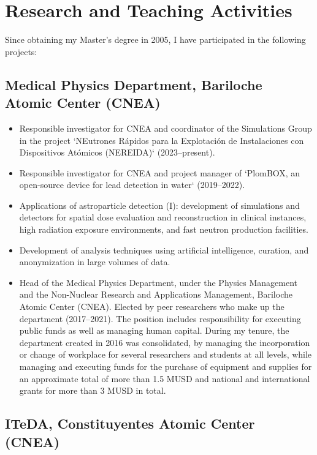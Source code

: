 \ifeng
\section*{Research and Teaching Activities}

Since obtaining my Master's degree in 2005, I have participated in the following projects:

\subsection*{Medical Physics Department, Bariloche Atomic Center (CNEA)}
\begin{itemize}
\item Responsible investigator for CNEA and coordinator of the Simulations Group in the project `NEutrones Rápidos para la Explotación de Instalaciones con Dispositivos Atómicos (NEREIDA)` (2023--present).
\item Responsible investigator for CNEA and project manager of `PlomBOX, an open-source device for lead detection in water` (2019--2022).
\item Applications of astroparticle detection (I): development of simulations and detectors for spatial dose evaluation and reconstruction in clinical instances, high radiation exposure environments, and fast neutron production facilities.
\item Development of analysis techniques using artificial intelligence, curation, and anonymization in large volumes of data.
\item Head of the Medical Physics Department, under the Physics Management and the Non-Nuclear Research and Applications Management, Bariloche Atomic Center (CNEA).
Elected by peer researchers who make up the department (2017--2021).
The position includes responsibility for executing public funds as well as managing human capital.
During my tenure, the department created in 2016 was consolidated, by managing the incorporation or change of workplace for several researchers and students at all levels, while managing and executing funds for the purchase of equipment and supplies for an approximate total of more than 1.5 MUSD and national and international grants for more than 3 MUSD in total.
\end{itemize}

\subsection*{ITeDA, Constituyentes Atomic Center (CNEA)}

